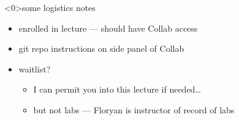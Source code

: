 \begin{frame}<0>{some logistics notes}
    \begin{itemize}
    \item enrolled in lecture --- should have Collab access
    \item git repo instructions on side panel of Collab
    \vspace{.5cm}
    \item waitlist?
        \begin{itemize}
        \item I can permit you into this lecture if needed\ldots
        \item but not labs --- Floryan is instructor of record of labs
        \end{itemize}
    \end{itemize}
\end{frame}
